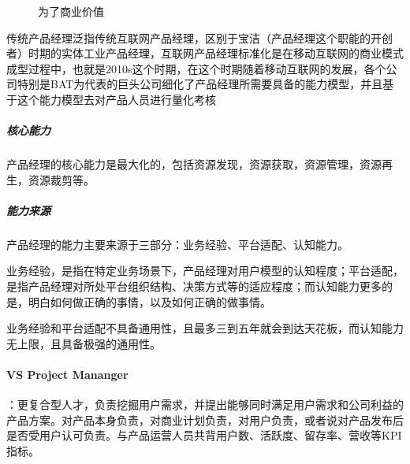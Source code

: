 \documentclass[letterpaper,11pt,english]{sphinxmanual}
\begin{document}
\begin{figure}[H]
\centering
\capstart

\noindent{}
\caption{为了商业价值}\label{\detokenize{chapter_introduction/PM:id67}}\end{figure}

传统产品经理泛指传统互联网产品经理，区别于宝洁（产品经理这个职能的开创者）时期的实体工业产品经理，互联网产品经理标准化是在移动互联网的商业模式成型过程中，也就是2010s这个时期，在这个时期随着移动互联网的发展，各个公司特别是BAT为代表的巨头公司细化了产品经理所需要具备的能力模型，并且基于这个能力模型去对产品人员进行量化考核
%
\begin{footnote}[128]\sphinxAtStartFootnote
{}
%
\end{footnote}


\subparagraph{核心能力}
\label{\detokenize{chapter_introduction/PM:id5}}
产品经理的核心能力是最大化的，包括资源发现，资源获取，资源管理，资源再生，资源裁剪等。
%
\begin{footnote}[129]\sphinxAtStartFootnote
{}
%
\end{footnote}


\subparagraph{能力来源}
\label{\detokenize{chapter_introduction/PM:id6}}
产品经理的能力主要来源于三部分：业务经验、平台适配、认知能力。

业务经验，是指在特定业务场景下，产品经理对用户模型的认知程度；平台适配，是指产品经理对所处平台组织结构、决策方式等的适应程度；而认知能力更多的是，明白如何做正确的事情，以及如何正确的做事情。

业务经验和平台适配不具备通用性，且最多三到五年就会到达天花板，而认知能力无上限，且具备极强的通用性。%
\begin{footnote}[130]\sphinxAtStartFootnote
{}
%
\end{footnote}


\paragraph{VS Project Mananger}
\label{\detokenize{chapter_introduction/PM:vs-project-mananger}}
：更复合型人才，负责挖掘用户需求，并提出能够同时满足用户需求和公司利益的产品方案。对产品本身负责，对商业计划负责，对用户负责，或者说对产品发布后是否受用户认可负责。与产品运营人员共背用户数、活跃度、留存率、营收等KPI指标。%
\begin{footnote}[131]\sphinxAtStartFootnote
{}
%
\end{footnote}
\end{document}
